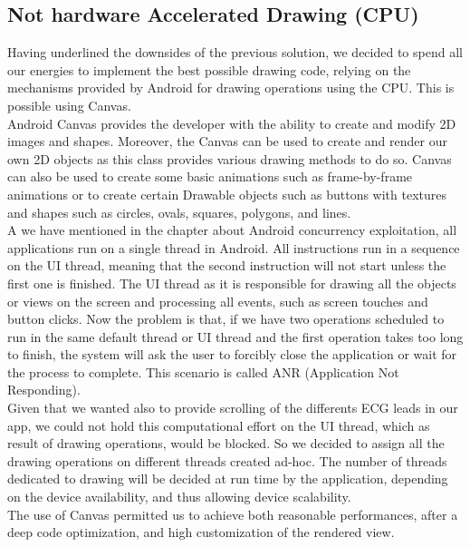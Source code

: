 \subsection{Not hardware Accelerated Drawing (CPU)}
Having underlined the downsides of the previous solution, we decided to spend all our energies to implement the best possible drawing code, relying on the mechanisms provided by Android for drawing operations using the CPU. This is possible using Canvas.\\
Android Canvas provides the developer with the ability to create and modify 2D images and shapes. Moreover, the Canvas can be used to create and render our own 2D objects as this class provides various drawing methods to do so. Canvas can also be used to create some basic animations such as frame-by-frame animations or to create certain Drawable objects such as buttons with textures and shapes such as circles, ovals, squares, polygons, and lines.\cite{ref21}\\
A we have mentioned in the chapter about Android concurrency exploitation, all applications run on a single thread in Android. All instructions run in a sequence on the UI thread, meaning that the second instruction will not start unless the first one is finished. The UI thread as it is responsible for drawing all the objects or views on the screen and processing all events, such as screen touches and button clicks. Now the problem is that, if we have two operations scheduled to run in the same default thread or UI thread and the first operation takes too long to finish, the system will ask the user to forcibly close the application or wait for the process to complete. This scenario is called ANR (Application Not Responding).\\
Given that we wanted also to provide scrolling of the differents ECG leads in our app, we could not hold this computational effort on the UI thread, which as result of drawing operations, would be blocked. So we decided to assign all the drawing operations on different threads created ad-hoc. The number of threads dedicated to drawing will be decided at run time by the application, depending on the device availability, and thus allowing device scalability.\\
The use of Canvas permitted us to achieve both reasonable performances, after a deep code optimization, and high customization of the rendered view.